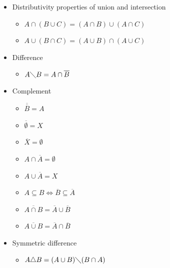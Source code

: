 \documentclass[margin=0px]{article}
\begin{document}
\begin{description}
\begin{itemize}
\begin{itemize}
                  \end{itemize}
            \item Distributivity properties of union and intersection
                  \begin{itemize}
                      \item $A \cap ( B \cup C ) = (A \cap B) \cup (A \cap C)$
                      \item $A \cup ( B \cap C ) = (A \cup B) \cap (A \cup C)$
                  \end{itemize}
            \item Difference
                  \begin{itemize}
                      \item $A \diagdown B = A \cap \overline{B}$
                  \end{itemize}
            \item Complement
                  \begin{itemize}
                      \item $\overline{\overline{B}} = A$
                      \item $\overline{\emptyset} = X$
                      \item $\overline{X} = \emptyset$
                      \item $A \cap \overline{A} = \emptyset$
                      \item $A \cup \overline{A} = X$
                      \item $A \subseteq B \Longleftrightarrow \overline{B} \subseteq \overline{A}$
                      \item $\overline{A \cap B} = \overline{A} \cup \overline{B}$
                      \item $\overline{A \cup B} = \overline{A} \cap \overline{B}$
                  \end{itemize}
            \item Symmetric difference
                  \begin{itemize}
                      \item $A \triangle B = (A \cup B) \diagdown (B \cap A)$
                  \end{itemize}
        \end{itemize}
\end{description}
\end{document}
